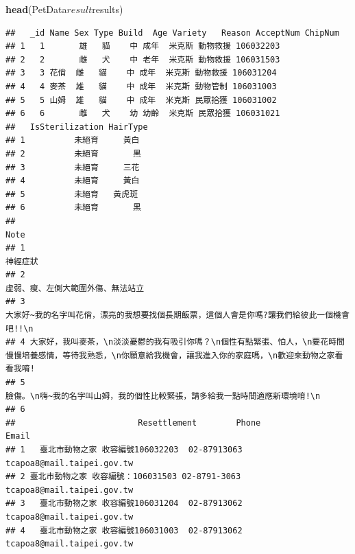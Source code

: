 \documentclass[]{book}
\newenvironment{Shaded}{\begin{snugshade}}{\end{snugshade}}
\newcommand{\KeywordTok}[1]{\textcolor[rgb]{0.13,0.29,0.53}{\textbf{{#1}}}}
\newcommand{\NormalTok}[1]{{#1}}
\theoremstyle{definition}
\theoremstyle{definition}
\theoremstyle{remark}
\begin{document}
\begin{Shaded}
\begin{Highlighting}[]
\KeywordTok{head}\NormalTok{(PetData$result$results)}
\end{Highlighting}
\end{Shaded}

\begin{verbatim}
##   _id Name Sex Type Build  Age Variety   Reason AcceptNum ChipNum
## 1   1       雄   貓    中 成年  米克斯 動物救援 106032203        
## 2   2       雌   犬    中 老年  米克斯 動物救援 106031503        
## 3   3 花俏  雌   貓    中 成年  米克斯 動物救援 106031204        
## 4   4 麥茶  雄   貓    中 成年  米克斯 動物管制 106031003        
## 5   5 山姆  雄   貓    中 成年  米克斯 民眾拾獲 106031002        
## 6   6       雌   犬    幼 幼齡  米克斯 民眾拾獲 106031021        
##   IsSterilization HairType
## 1          未絕育     黃白
## 2          未絕育       黑
## 3          未絕育     三花
## 4          未絕育     黃白
## 5          未絕育   黃虎斑
## 6          未絕育       黑
##                                                                                                                                                                    Note
## 1                                                                                                                                                              神經症狀
## 2                                                                                                                                    虛弱、瘦、左側大範圍外傷、無法站立
## 3                                                                            大家好~我的名字叫花俏，漂亮的我想要找個長期飯票，這個人會是你嗎?讓我們給彼此一個機會吧!!\n
## 4 大家好，我叫麥茶，\n淡淡憂鬱的我有吸引你嗎？\n個性有點緊張、怕人，\n要花時間慢慢培養感情，等待我熟悉，\n你願意給我機會，讓我進入你的家庭嗎，\n歡迎來動物之家看看我唷!
## 5                                                                                          臉傷。\n嗨~我的名字叫山姆，我的個性比較緊張，請多給我一點時間適應新環境唷!\n
## 6                                                                                                                                                                      
##                         Resettlement        Phone                      Email
## 1   臺北市動物之家 收容編號106032203  02-87913063 tcapoa8@mail.taipei.gov.tw
## 2 臺北市動物之家 收容編號：106031503 02-8791-3063 tcapoa8@mail.taipei.gov.tw
## 3   臺北市動物之家 收容編號106031204  02-87913062 tcapoa8@mail.taipei.gov.tw
## 4   臺北市動物之家 收容編號106031003  02-87913062 tcapoa8@mail.taipei.gov.tw

\end{verbatim}
\end{document}
